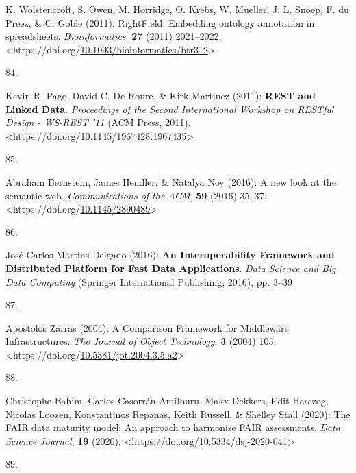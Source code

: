 \begin{thebibliography}{9}
K. Wolstencroft, S. Owen, M. Horridge, O. Krebs, W. Mueller, J. L.
Snoep, F. du Preez, \& C. Goble (2011): {RightField}: Embedding ontology
annotation in spreadsheets. \emph{Bioinformatics}, \textbf{27} (2011)
2021--2022.
\textless https://doi.org/\href{https://doi.org/10.1093/bioinformatics/btr312}{10.1093/bioinformatics/btr312}\textgreater{}

\hypertarget{ref-pageRESTLinkedData2011}{}
84.

Kevin R. Page, David C. De Roure, \& Kirk Martinez (2011):
\textbf{{REST} and {Linked Data}}. \emph{Proceedings of the {Second
International Workshop} on {RESTful Design} - {WS-REST} '11} ({ACM
Press}, 2011).
\textless https://doi.org/\href{https://doi.org/10.1145/1967428.1967435}{10.1145/1967428.1967435}\textgreater{}

\hypertarget{ref-bernsteinNewLookSemantic2016a}{}
85.

Abraham Bernstein, James Hendler, \& Natalya Noy (2016): A new look at
the semantic web. \emph{Communications of the ACM}, \textbf{59} (2016)
35--37.
\textless https://doi.org/\href{https://doi.org/10.1145/2890489}{10.1145/2890489}\textgreater{}

\hypertarget{ref-delgadoInteroperabilityFrameworkDistributed2016a}{}
86.

José Carlos Martins Delgado (2016): \textbf{An {Interoperability
Framework} and {Distributed Platform} for {Fast Data Applications}}.
\emph{Data {Science} and {Big Data Computing}} ({Springer International
Publishing}, 2016), pp. 3--39

\hypertarget{ref-zarrasComparisonFrameworkMiddleware2004a}{}
87.

Apostolos Zarras (2004): A {Comparison Framework} for {Middleware
Infrastructures}. \emph{The Journal of Object Technology}, \textbf{3}
(2004) 103.
\textless https://doi.org/\href{https://doi.org/10.5381/jot.2004.3.5.a2}{10.5381/jot.2004.3.5.a2}\textgreater{}

\hypertarget{ref-bahimFAIRDataMaturity2020a}{}
88.

Christophe Bahim, Carlos Casorrán-Amilburu, Makx Dekkers, Edit Herczog,
Nicolas Loozen, Konstantinos Repanas, Keith Russell, \& Shelley Stall
(2020): The {FAIR} data maturity model: {An} approach to harmonise
{FAIR} assessments. \emph{Data Science Journal}, \textbf{19} (2020).
\textless https://doi.org/\href{https://doi.org/10.5334/dsj-2020-041}{10.5334/dsj-2020-041}\textgreater{}

\hypertarget{ref-stallingsHandbookComputercommunicationsStandards1990}{}
89.


\end{thebibliography}
